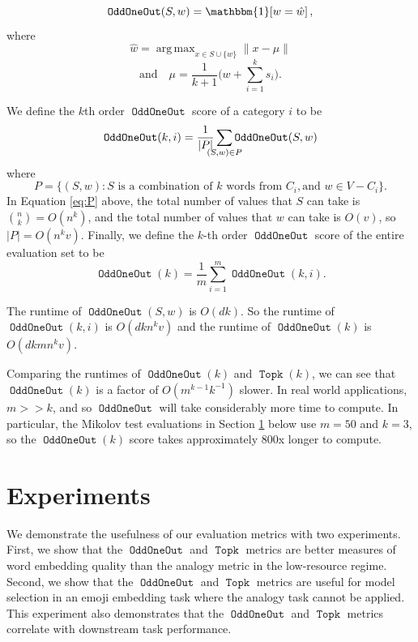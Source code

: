 \documentclass[11pt,a4paper]{article}
\newcommand{\ltwo}[1]{\lVert{#1}\rVert}
\newcommand{\indicator}[1]{\mathbbm{1}\!\left[{#1}\right]}
\DeclareMathOperator*{\argmax}{arg\,max}
\DeclareMathOperator{\OddOneOut}{\texttt{OddOneOut}}
\DeclareMathOperator{\topk}{\texttt{Topk}}
\begin{document}
\begin{equation}
    \OddOneOut(S,w) = \indicator{w = \hat w},
\end{equation}
where
\begin{equation}
    \hat w = \argmax_{x \in S\cup\{w\}} \ltwo{x - \mu}
\end{equation}
\begin{equation}
    \text{and}
    \quad
    \mu = \frac1{k+1}\bigg(w + \sum_{i=1}^k{s_i}\bigg)
    .
\end{equation}


We define the $k$th order $\OddOneOut$ score of a category $i$ to be
\begin{equation}
    \OddOneOut(k,i) = \frac 1 {|P|} \sum_{\mathclap{(S,w) \in P}} \OddOneOut(S,w)
\end{equation}
where
\begin{equation}
    P = \{ (S, w) : S \text{~is a combination of $k$ words from $C_i$}, \text{and~} w \in V-C_i \}
    .
    \label{eq:P}
\end{equation}
In Equation \eqref{eq:P} above,
the total number of values that $S$ can take is ${n \choose k} = O(n^k)$,
and the total number of values that $w$ can take is $O(v)$,
so $|P| = O(n^kv)$.
Finally, we define the $k$-th order $\OddOneOut$ score of the entire evaluation set to be
\begin{equation}
    \OddOneOut(k) = \frac 1 m \sum_{i=1}^m \OddOneOut(k,i)
    .
\end{equation}

The runtime of $\OddOneOut(S,w)$ is $O(dk)$.
So the runtime of $\OddOneOut(k,i)$ is $O(dkn^kv)$ and the runtime of $\OddOneOut(k)$ is $O(dkmn^kv)$.

Comparing the runtimes of $\OddOneOut(k)$ and $\topk(k)$, we can see that $\OddOneOut(k)$ is a factor of $O(m^{k-1}k^{-1})$ slower.
In real world applications, $m >\!\!> k$, and so $\OddOneOut$ will take considerably more time to compute.
In particular, the Mikolov test evaluations in Section \ref{sec:experiments} below use $m=50$ and $k=3$,
so the $\OddOneOut(k)$ score takes approximately 800x longer to compute.

\section{Experiments}
\label{sec:experiments}

We demonstrate the usefulness of our evaluation metrics with two experiments.
First, we show that the $\OddOneOut$ and $\topk$ metrics are better measures of word embedding quality than the analogy metric in the low-resource regime.
Second, we show that the $\OddOneOut$ and $\topk$ metrics are useful for model selection in an emoji embedding task where the analogy task cannot be applied.
This experiment also demonstrates that the $\OddOneOut$ and $\topk$ metrics correlate with downstream task performance.
\end{document}
